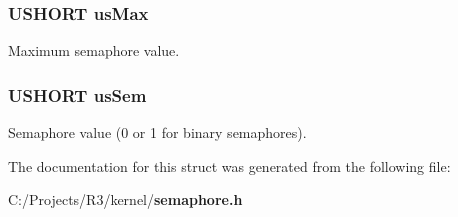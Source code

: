 \subsubsection[{usMax}]{\setlength{\rightskip}{0pt plus 5cm}USHORT {\bf usMax}}\label{struct_s_e_m_a_p_h_o_r_e___s_t_r_u_c_t_a740087a43ba1ea71752237636daec256}


Maximum semaphore value. 
\subsubsection[{usSem}]{\setlength{\rightskip}{0pt plus 5cm}USHORT {\bf usSem}}\label{struct_s_e_m_a_p_h_o_r_e___s_t_r_u_c_t_a6c42a3763ca51563595b79ccf650991c}


Semaphore value (0 or 1 for binary semaphores). 

The documentation for this struct was generated from the following file:\begin{DoxyCompactItemize}
\item 
C:/Projects/R3/kernel/{\bf semaphore.h}\end{DoxyCompactItemize}
